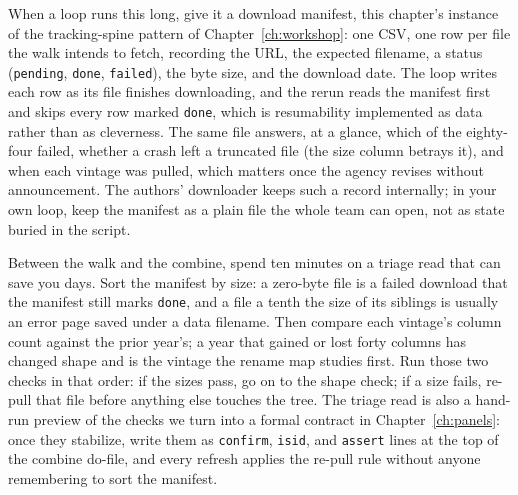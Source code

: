 \documentclass[
    a4paper,
    fontsize=10pt,
    twoside=true,
    numbers=noenddot,
]{kaobook}
\begin{document}
When a loop runs this long, give it a download manifest, this chapter's instance of the tracking-spine pattern of Chapter~\ref{ch:workshop}: one CSV, one row per file the walk intends to fetch, recording the URL, the expected filename, a status (\texttt{pending}, \texttt{done}, \texttt{failed}), the byte size, and the download date. The loop writes each row as its file finishes downloading, and the rerun reads the manifest first and skips every row marked \texttt{done}, which is resumability implemented as data rather than as cleverness. The same file answers, at a glance, which of the eighty-four failed, whether a crash left a truncated file (the size column betrays it), and when each vintage was pulled, which matters once the agency revises without announcement. The authors' downloader keeps such a record internally; in your own loop, keep the manifest as a plain file the whole team can open, not as state buried in the script.

Between the walk and the combine, spend ten minutes on a triage read that can save you days. Sort the manifest by size: a zero-byte file is a failed download that the manifest still marks \texttt{done}, and a file a tenth the size of its siblings is usually an error page saved under a data filename. Then compare each vintage's column count against the prior year's; a year that gained or lost forty columns has changed shape and is the vintage the rename map studies first. Run those two checks in that order: if the sizes pass, go on to the shape check; if a size fails, re-pull that file before anything else touches the tree. The triage read is also a hand-run preview of the checks we turn into a formal contract in Chapter~\ref{ch:panels}: once they stabilize, write them as \texttt{confirm}, \texttt{isid}, and \texttt{assert} lines at the top of the combine do-file, and every refresh applies the re-pull rule without anyone remembering to sort the manifest.
\end{document}

